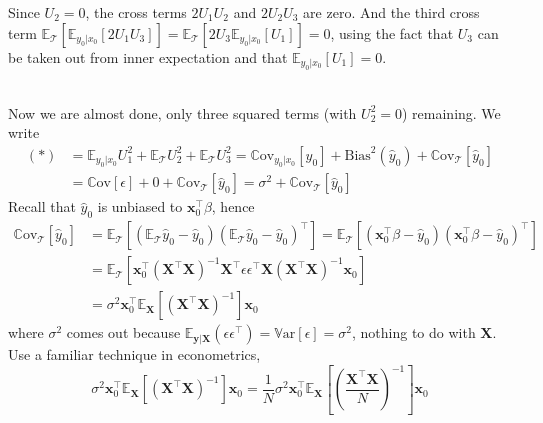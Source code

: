 \documentclass[a4paper, 11pt]{article}
\begin{document}
Since $U_2=0$, the cross terms $2U_1U_2$ and $2U_2U_3$ are zero. And the third cross term $\mathbb{E}_{\mathcal{T}}\left[\mathbb{E}_{y_0|x_0}\left[2U_1U_3\right]\right] = \mathbb{E}_{\mathcal{T}}\left[2U_3\mathbb{E}_{y_0|x_0}\left[U_1\right]\right] = 0$, using the fact that $U_3$ can be taken out from inner expectation and that $\mathbb{E}_{y_0|x_0}\left[U_1\right] = 0$. 

~\\
Now we are almost done, only three squared terms (with $U_2^2 = 0$) remaining. We write
\begin{equation}
	\begin{split}
		(*) &= \mathbb{E}_{y_0|x_0} U_1^2 + \mathbb{E}_{\mathcal{T}} U_2^2 + \mathbb{E}_{\mathcal{T}} U_3^2 = \mathrm{\mathbb{C}ov}_{y_0|x_0}\left[y_0\right] + \text{Bias}^2 (\hat{y}_0) + \mathrm{\mathbb{C}ov}_{\mathcal{T}}\left[\hat{y}_0\right] \\
		&= \mathrm{\mathbb{C}ov}\left[\epsilon\right] + 0 + \mathrm{\mathbb{C}ov}_{\mathcal{T}}\left[\hat{y}_0\right] = \sigma^2 + \mathrm{\mathbb{C}ov}_{\mathcal{T}}\left[\hat{y}_0\right]
	\end{split}
\end{equation}
Recall that $\hat{y}_0$ is unbiased to $\bm{x}_0^{\top}\beta$, hence
\begin{equation}
	\begin{split}
		\mathrm{\mathbb{C}ov}_{\mathcal{T}}\left[\hat{y}_0\right] &= \mathbb{E}_{\mathcal{T}}\left[(\mathbb{E}_{\mathcal{T}}{\hat{y}_0}-\hat{y}_0)(\mathbb{E}_{\mathcal{T}}{\hat{y}_0}-\hat{y}_0)^{\top}\right] = \mathbb{E}_{\mathcal{T}}\left[(\bm{x}_0^{\top}\beta-\hat{y}_0)(\bm{x}_0^{\top}\beta-\hat{y}_0)^{\top}\right] \\
		&= \mathbb{E}_{\mathcal{T}}\left[\bm{x}_0^{\top}(\bm{X}^{\top}\bm{X})^{-1} \bm{X}^{\top}\epsilon \epsilon^{\top} \bm{X}(\bm{X}^{\top}\bm{X})^{-1} \bm{x}_0\right] \\
		& = \sigma^2\bm{x}_0^{\top} \mathbb{E}_{\bm{X}}\left[(\bm{X}^{\top}\bm{X})^{-1}\right] \bm{x}_0
	\end{split}
\end{equation}
where $\sigma^2$ comes out because $\mathbb{E}_{\bm{y}|\bm{X}}(\epsilon \epsilon^{\top}) = \mathrm{\mathbb{V}ar}\left[\epsilon\right] = \sigma^2$, nothing to do with $\bm{X}$. Use a familiar technique in econometrics,
$$
\sigma^2\bm{x}_0^{\top} \mathbb{E}_{\bm{X}}\left[(\bm{X}^{\top}\bm{X})^{-1}\right] \bm{x}_0 = \frac{1}{N}\sigma^2\bm{x}_0^{\top} \mathbb{E}_{\bm{X}}\left[\left(\frac{\bm{X}^{\top}\bm{X}}{N}\right)^{-1}\right] \bm{x}_0
$$
\end{document}
